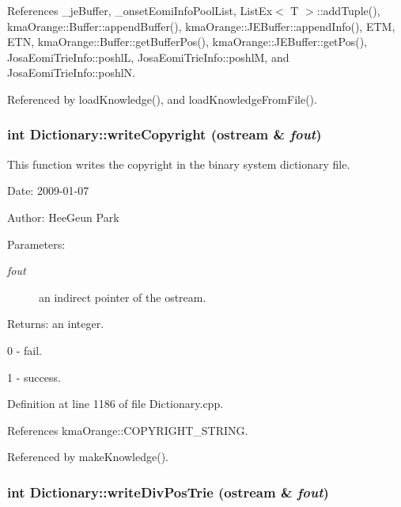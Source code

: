 References \_\-jeBuffer, \_\-onsetEomiInfoPoolList, ListEx$<$ T $>$::addTuple(), kmaOrange::Buffer::appendBuffer(), kmaOrange::JEBuffer::appendInfo(), ETM, ETN, kmaOrange::Buffer::getBufferPos(), kmaOrange::JEBuffer::getPos(), JosaEomiTrieInfo::poshlL, JosaEomiTrieInfo::poshlM, and JosaEomiTrieInfo::poshlN.

Referenced by loadKnowledge(), and loadKnowledgeFromFile().\hypertarget{classkmaOrange_1_1Dictionary_48925ba3955d2efa603e1ec42ebc98fb}{
\subsubsection[{writeCopyright}]{\setlength{\rightskip}{0pt plus 5cm}int Dictionary::writeCopyright (ostream \& {\em fout})}}
\label{classkmaOrange_1_1Dictionary_48925ba3955d2efa603e1ec42ebc98fb}


This function writes the copyright in the binary system dictionary file. 

\begin{Desc}
\item[Date:]2009-01-07 \end{Desc}
\begin{Desc}
\item[Author:]HeeGeun Park \end{Desc}
\begin{Desc}
\item[Parameters:]
\begin{description}
\item[{\em fout}]an indirect pointer of the ostream. \end{description}
\end{Desc}
\begin{Desc}
\item[Returns:]an integer.\par
 0 - fail.\par
 1 - success. \end{Desc}


Definition at line 1186 of file Dictionary.cpp.

References kmaOrange::COPYRIGHT\_\-STRING.

Referenced by makeKnowledge().\hypertarget{classkmaOrange_1_1Dictionary_8a9ffe32003af4423dbe33f9e29d8627}{
\subsubsection[{writeDivPosTrie}]{\setlength{\rightskip}{0pt plus 5cm}int Dictionary::writeDivPosTrie (ostream \& {\em fout})}}
\label{classkmaOrange_1_1Dictionary_8a9ffe32003af4423dbe33f9e29d8627}


